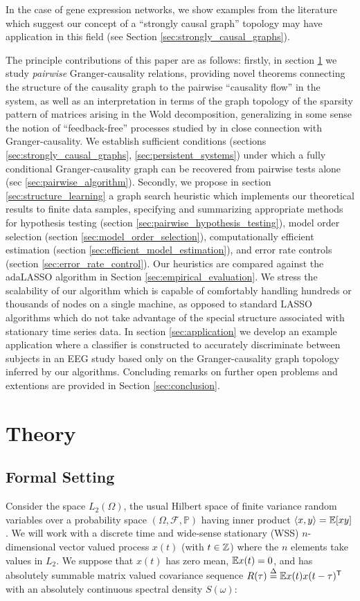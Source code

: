 \documentclass[12pt]{article}
\begin{document}
In the case of gene expression networks, we show examples from the
literature which suggest our concept of a ``strongly causal graph''
topology may have application in this field (see Section
\ref{sec:strongly_causal_graphs}).

The principle contributions of this paper are as follows: firstly, in
section \ref{sec:theory} we study \textit{pairwise} Granger-causality
relations, providing novel theorems connecting the structure of the
causality graph to the pairwise ``causality flow'' in the system, as
well as an interpretation in terms of the graph topology of the
sparsity pattern of matrices arising in the Wold decomposition,
generalizing in some sense the notion of ``feedback-free'' processes
studied by \cite{caines1975feedback} in close connection with
Granger-causality.  We establish sufficient conditions (sections
\ref{sec:strongly_causal_graphs}, \ref{sec:persistent_systems}) under
which a fully conditional Granger-causality graph can be recovered
from pairwise tests alone (sec \ref{sec:pairwise_algorithm}).
Secondly, we propose in section \ref{sec:structure_learning} a graph
search heuristic which implements our theoretical results to finite
data samples, specifying and summarizing appropriate methods for
hypothesis testing (section \ref{sec:pairwise_hypothesis_testing}),
model order selection (section \ref{sec:model_order_selection}),
computationally efficient estimation (section
\ref{sec:efficient_model_estimation}), and error rate controls
(section \ref{sec:error_rate_control}).  Our heuristics are compared
against the adaLASSO algorithm in Section
\ref{sec:empirical_evaluation}.  We stress the scalability of our
algorithm which is capable of comfortably handling hundreds or
thousands of nodes on a single machine, as opposed to standard LASSO
algorithms which do not take advantage of the special structure
associated with stationary time series data.  In section
\ref{sec:application} we develop an example application where a
classifier is constructed to accurately discriminate between subjects
in an EEG study based only on the Granger-causality graph topology
inferred by our algorithms.  Concluding remarks on further open
problems and extentions are provided in Section \ref{sec:conclusion}.

\section{Theory}
\label{sec:theory}
\subsection{Formal Setting}
Consider the space $L_2(\Omega)$, the usual Hilbert space of finite
variance random variables over a probability space
$(\Omega, \mathcal{F}, \mathbb{P})$ having inner product
$\langle x, y \rangle = \mathbb{E}[xy]$.  We will work with a discrete time and
wide-sense stationary (WSS) $n$-dimensional vector valued process
$x(t)$ (with $t \in \mathbb{Z}$) where the $n$ elements take values in $L_2$.  We
suppose that $x(t)$ has zero mean, $\mathbb{E} x(t) = 0$, and has absolutely
summable matrix valued covariance sequence
$R(\tau) \overset{\Delta}{=} \mathbb{E} x(t)x(t - \tau)^{\mathsf{T}}$ with an absolutely
continuous spectral density $S(\omega)$:
\end{document}
